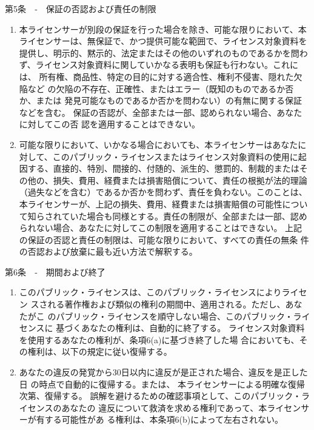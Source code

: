 {第5条　‐　保証の否認および責任の制限

\begin{enumerate}
\renewcommand{\labelenumi}{\alph{enumi}.}
\renewcommand{\labelenumii}{\arabic{enumii}.}
\renewcommand{\labelenumiii}{\Alph{enumiii}.}
\item  本ライセンサーが別段の保証を行った場合を除き、可能な限りにおいて、本
 ライセンサーは、無保証で、かつ提供可能な範囲で、ライセンス対象資料を
 提供し、明示的、黙示的、法定またはその他のいずれのものであるかを問わ
 ず、ライセンス対象資料に関していかなる表明も保証も行わない。これには、
 所有権、商品性、特定の目的に対する適合性、権利不侵害、隠れた欠陥など
 の欠陥の不存在、正確性、またはエラー（既知のものであるか否か、または
   発見可能なものであるか否かを問わない）の有無に関する保証などを含む。
 保証の否認が、全部または一部、認められない場合、あなたに対してこの否
 認を適用することはできない。
\item  可能な限りにおいて、いかなる場合においても、本ライセンサーはあなたに
 対して、このパブリック・ライセンスまたはライセンス対象資料の使用に起
 因する、直接的、特別、間接的、付随的、派生的、懲罰的、制裁的またはそ
 の他の、損失、費用、経費または損害賠償について、責任の根拠が法的理論
 （過失などを含む）であるか否かを問わず、責任を負わない。このことは、
 本ライセンサーが、上記の損失、費用、経費または損害賠償の可能性につい
 て知らされていた場合も同様とする。責任の制限が、全部または一部、認め
 られない場合、あなたに対してこの制限を適用することはできない。
上記の保証の否認と責任の制限は、可能な限りにおいて、すべての責任の無条
件の否認および放棄に最も近い方法で解釈する。

\end{enumerate}

第6条　‐　期間および終了

\begin{enumerate}
\renewcommand{\labelenumi}{\alph{enumi}.}
\renewcommand{\labelenumii}{\arabic{enumii}.}
\renewcommand{\labelenumiii}{\Alph{enumiii}.}
\item このパブリック・ライセンスは、このパブリック・ライセンスによりライセン
スされる著作権および類似の権利の期間中、適用される。ただし、あなたがこ
のパブリック・ライセンスを順守しない場合、このパブリック・ライセンスに
基づくあなたの権利は、自動的に終了する。
ライセンス対象資料を使用するあなたの権利が、条項6(a)に基づき終了した場
合においても、その権利は、以下の規定に従い復帰する。

\item あなたの違反の発覚から30日以内に違反が是正された場合、違反を是正した日
の時点で自動的に復帰する。または、
本ライセンサーによる明確な復帰次第、復帰する。
誤解を避けるための確認事項として、このパブリック・ライセンスのあなたの
違反について救済を求める権利であって、本ライセンサーが有する可能性があ
る権利は、本条項6(b)によって左右されない。


\end{enumerate}}
